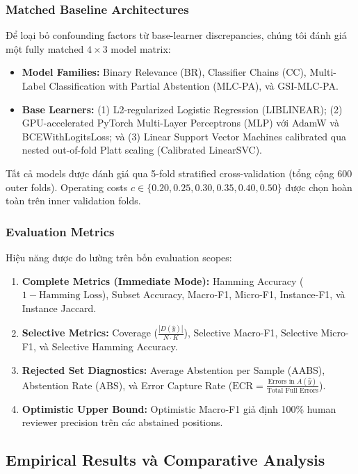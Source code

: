 \documentclass[conference]{IEEEtran}
\begin{document}
\subsubsection{Matched Baseline Architectures}
Để loại bỏ confounding factors từ base-learner discrepancies, chúng tôi đánh giá một fully matched $4 \times 3$ model matrix:
\begin{itemize}
    \item \textbf{Model Families:} Binary Relevance (BR), Classifier Chains (CC), Multi-Label Classification with Partial Abstention (MLC-PA), và GSI-MLC-PA.
    \item \textbf{Base Learners:} (1) L2-regularized Logistic Regression (LIBLINEAR); (2) GPU-accelerated PyTorch Multi-Layer Perceptrons (MLP) với AdamW và BCEWithLogitsLoss; và (3) Linear Support Vector Machines calibrated qua nested out-of-fold Platt scaling (Calibrated LinearSVC).
\end{itemize}
Tất cả models được đánh giá qua 5-fold stratified cross-validation (tổng cộng 600 outer folds). Operating costs $c \in \{0.20, 0.25, 0.30, 0.35, 0.40, 0.50\}$ được chọn hoàn toàn trên inner validation folds.

\subsubsection{Evaluation Metrics}
Hiệu năng được đo lường trên bốn evaluation scopes:
\begin{enumerate}
    \item \textbf{Complete Metrics (Immediate Mode):} Hamming Accuracy ($1 - \text{Hamming Loss}$), Subset Accuracy, Macro-F1, Micro-F1, Instance-F1, và Instance Jaccard.
    \item \textbf{Selective Metrics:} Coverage ($\frac{|D(\hat{y})|}{N \cdot K}$), Selective Macro-F1, Selective Micro-F1, và Selective Hamming Accuracy.
    \item \textbf{Rejected Set Diagnostics:} Average Abstention per Sample (AABS), Abstention Rate (ABS), và Error Capture Rate ($\text{ECR} = \frac{\text{Errors in } A(\hat{y})}{\text{Total Full Errors}}$).
    \item \textbf{Optimistic Upper Bound:} Optimistic Macro-F1 giả định 100\% human reviewer precision trên các abstained positions.
\end{enumerate}

\subsection{Empirical Results và Comparative Analysis}
\end{document}
